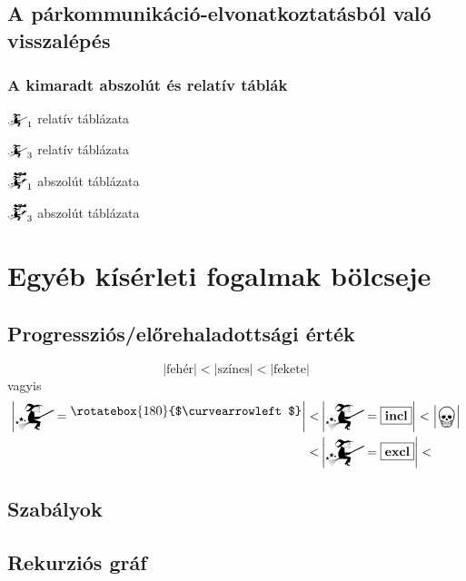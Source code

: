\documentclass{article}
\newcommand{\nothing}{\text{\raisebox{0.4em}{\rotatebox{180}{$\curvearrowleft$}}}}%
\newcommand{\just}[1]{\boxed{#1}}%
\newcommand{\incl}{\mathbf{incl}}
\newcommand{\excl}{\mathbf{excl}}
\newcommand{\currymainfun}[1]{\mathwitch_{#1}}
\newcommand{\currymainfunabs}[1]{\overbat{\mathwitch*_{#1}}}
\newcommand{\progr}[1]{\left|#1\right|}
\begin{document}
	\subsection{A párkommunikáció-elvonatkoztatásból való visszalépés}

	\subsubsection{A kimaradt abszolút és relatív táblák}

	\begin{table}[H]
		\caption*{$\currymainfun1$ relatív táblázata}
		\centering
	\end{table}

	\begin{table}[H]
		\caption*{$\currymainfun3$ relatív táblázata}
		\centering
	\end{table}

	\begin{table}[H]
		\caption*{$\currymainfunabs1$ abszolút táblázata}
		\centering
	\end{table}

	\begin{table}[H]
		\caption*{$\currymainfunabs3$ abszolút táblázata}
		\centering
	\end{table}

	\section{Egyéb kísérleti fogalmak bölcseje}

	\subsection{Progressziós/előrehaladottsági érték}
	\begin{displaymath}
		\progr{\text{fehér}} < \progr{\text{színes}} < \progr{\text{fekete}}
	\end{displaymath}
	vagyis
	\begin{align*}
		\progr{\mathwitch=\nothing} < &\progr{\mathwitch=\just\incl} < \progr{\bigskull}\\
		                            < &\progr{\mathwitch=\just\excl} <
	\end{align*}
	\subsection{Szabályok}

	\subsection{Rekurziós gráf}
\end{document}
